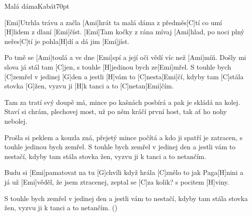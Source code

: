 \begin{song}{Malá dáma}{Kabát}{70pt}

%
[Emi]{}Utrhla trávu a začla [Ami]hrát ta malá dáma z předměs[C]tí
co umí [H]lidem z dlaní [Emi]{číst}.
[Emi]{}Tam kočky z rána mívaj [Ami]hlad, po noci plný neřes[C]tí
je pohla[H]dí a dá jim [Emi]jíst.

\chorus%
Po tmě se [Ami]toulá a ve dne [Emi]spí a její oči vědí víc než [Ami]míň.
Došly mi slova já stál tam [C]jen, s touhle [H]jedinou bych ze[Emi]mřel.
S touhle bych [C]zemřel v jedinej [G]den a jestli [H]vám to [C]nesta[Emi]{čí},
kdyby tam [C]stála stovka [G]{ž}en, vyzvu ji [H]k tanci a to [C]netan[Emi]{čím}.

%
Tam za tratí svý doupě má, mince po kašnách posbírá 
a pak je skládá na kolej.
Staví si chrám, plechovej most, už po něm kráčí první host,
tak ať ho nohy nebolej.

\chorus%
Prošla si peklem a kouzla zná, přejetý mince počítá 
a kdo ji spatří je zatracen, s touhle jedinou bych zemřel.
S touhle bych zemřel v jedinej den a jestli vám to nestačí,
kdyby tam stála stovka žen, vyzvu ji k tanci a to netančím.

\verse{*}%
Budu si [Emi]pamatovat na tu [G]chvíli když hrála [C]znělo to jak Paga[H]nini
a já už [Emi]věděl, že jsem ztracenej, zeptal se [C]za kolik? s pocitem [H]viny.                                 

\chorus%
S touhle bych zemřel v jedinej den a jestli vám to nestačí,
kdyby tam stála stovka žen, vyzvu ji k tanci a to netančím.
()
\end{song}
